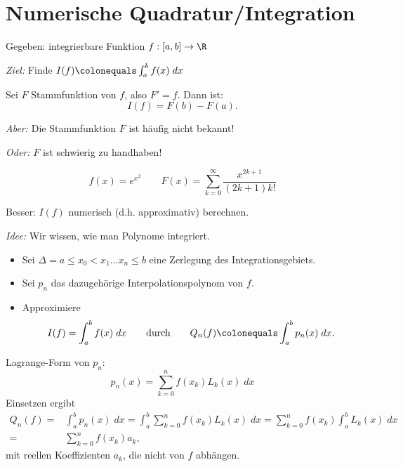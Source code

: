 \chapter{Numerische Quadratur/Integration}

Gegeben: integrierbare Funktion $f: [a,b] \to \R$

\medskip

\emph{Ziel:} Finde $I(f) \colonequals \int_a^b f(x) \; dx$
\begin{satz}[Fundamentalsatz]
Sei $F$ Stammfunktion von $f$, also $F'=f$. Dann ist:
\begin{equation*}
I(f) = F(b) - F(a).
\end{equation*}
\end{satz}
\emph{Aber:} Die Stammfunktion $F$ ist häufig nicht bekannt!

\medskip

\emph{Oder:} $F$ ist schwierig zu handhaben!
\begin{bsp}
\begin{equation*}
f(x) = e^{x^2}
\qquad
F(x) = \sum_{k=0}^\infty \frac{x^{2k +1}}{(2k+1)k!}
\end{equation*}
\end{bsp}
Besser: $I(f)$ numerisch (d.h. approximativ) berechnen.

\bigskip

\emph{Idee:} Wir wissen, wie man Polynome integriert.
\begin{itemize}
\item Sei $\Delta = a \le x_0 < x_1 \dots x_n \le b$ eine Zerlegung des Integrationsgebiets.
\item Sei $p_n$ das dazugehörige Interpolationspolynom von $f$.
\item Approximiere
 \begin{equation*}
  I(f) = \int_a^b f(x) \; dx
  \qquad \text{durch} \qquad
  Q_n(f) \colonequals \int_a^b p_n(x) \; dx.
 \end{equation*}
\end{itemize}
Lagrange-Form von $p_n$:
\begin{equation*}
p_n(x) = \sum_{k=0}^n f(x_k) L_k(x) \; dx
\end{equation*}
Einsetzen ergibt
\begin{align*}
 Q_n(f) = & \int_a^b p_n(x) \; dx = \int_a^b \sum_{k=0}^n f(x_k) L_k(x) \; dx = \sum_{k=0}^{n}f(x_k) \int_a^b L_k(x) \; dx
\\ = & \sum_{k=0}^n f(x_k) a_k,
\end{align*}
mit reellen Koeffizienten $a_k$, die nicht von $f$ abhängen.

